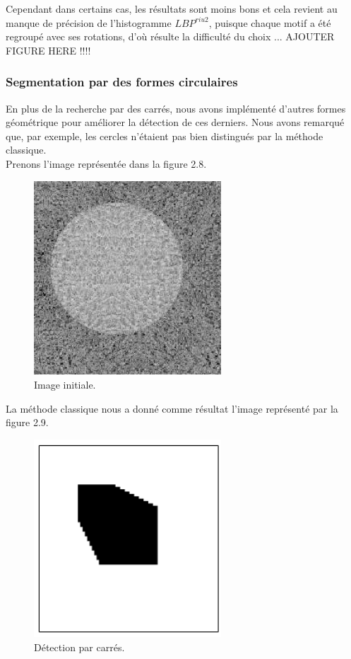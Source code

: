 \indent Cependant dans certains cas, les résultats sont moins bons et cela revient au manque de précision de l'histogramme $LBP^{riu2}$, puisque chaque motif a été regroupé avec ses rotations, d'où résulte la difficulté du choix ... AJOUTER FIGURE HERE !!!!\\


\subsubsection{Segmentation par des formes circulaires}
\indent En plus de la recherche par des carrés, nous avons implémenté d'autres formes géométrique pour améliorer la détection de ces derniers.
Nous avons remarqué que, par exemple, les cercles n'étaient pas bien distingués par la méthode classique. \\
\indent Prenons l'image représentée dans la figure 2.8.

\begin{figure}[H]
	\centering
		\includegraphics[width=7cm,]{Figures/chap2/8.png}
		
	\caption[img]{Image initiale.}
	\label{fig:division}
\end{figure}

La méthode classique nous a donné comme résultat l'image représenté par la figure 2.9.

\begin{figure}[H]
	\centering
		\includegraphics[width=7cm,]{Figures/chap2/9.png}
		
	\caption[imgCarre]{Détection par carrés.}
	\label{fig:division}
\end{figure}


